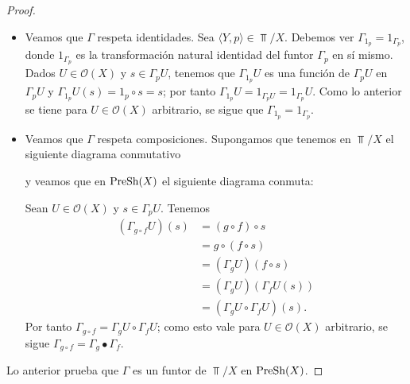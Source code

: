 \begin{proof}
   \begin{itemize}
      \item Veamos que $\Gamma$ respeta identidades. Sea $\langle Y, p\rangle\in \Top /X$. Debemos ver $\Gamma_{1_{p}}=1_{\Gamma_{p}}$, donde $1_{\Gamma_{p}}$ es la transformación natural identidad del funtor $\Gamma_p$ en sí mismo. Dados $U\in \mathcal{O}(X)$ y $s\in \Gamma_p U$, tenemos que $\Gamma_{1_p} U$ es una función de $\Gamma_p U$ en $\Gamma_p U$ y $\Gamma_{1_p}U(s)=1_p\circ s=s$; por tanto $\Gamma_{1_p}U=1_{\Gamma_p U}=1_{\Gamma_p}U$. Como lo anterior se tiene para $U\in \mathcal{O}(X)$ arbitrario, se sigue que $\Gamma_{1_p}=1_{\Gamma_p}$.
      \item Veamos que $\Gamma$ respeta composiciones. Supongamos que tenemos en $\Top /X$ el siguiente diagrama conmutativo
         
         y veamos que en $\normalfont{\text{PreSh}}(X)$ el siguiente diagrama conmuta:
         
         Sean $U\in\mathcal{O}(X)$ y $s\in\Gamma_p U$. Tenemos
         $$
         \begin{aligned}
            (\Gamma_{g\circ f}U)(s)&=(g\circ f)\circ s\\
                                   &=g\circ(f\circ s)\\
                                   &=(\Gamma_{g}U)(f\circ s)\\
                                   &=(\Gamma_{g}U)(\Gamma_{f}U(s))\\
                                   &=(\Gamma_{g}U\circ\Gamma_{f}U)(s).
         \end{aligned}
         $$
         Por tanto $\Gamma_{g\circ f}=\Gamma_{g}U\circ\Gamma_{f}U$; como esto vale para $U\in\mathcal{O}(X)$ arbitrario, se sigue $\Gamma_{g\circ f}=\Gamma_{g}\bullet\Gamma_{f}$.
   \end{itemize}
   Lo anterior prueba que $\Gamma$ es un funtor de $\Top /X$ en $\normalfont{\text{PreSh}}(X)$.
\end{proof}

